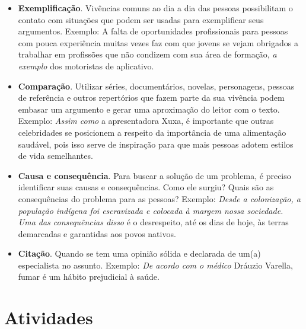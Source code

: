 {\begin{itemize}
\item \textbf{Exemplificação}. Vivências comuns ao dia a dia das pessoas possibilitam o contato com situações que podem ser usadas para exemplificar seus argumentos. Exemplo: A falta de oportunidades profissionais para pessoas com pouca experiência muitas vezes faz com que jovens se vejam obrigados a trabalhar em profissões que não condizem com sua área de formação, \emph{a exemplo} dos motoristas de aplicativo.

\item \textbf{Comparação}. Utilizar séries, documentários, novelas, personagens, pessoas de referência e outros repertórios que fazem parte da sua vivência podem embasar um argumento e gerar uma aproximação do leitor com o texto. Exemplo: \emph{Assim como} a apresentadora Xuxa, é importante que outras celebridades se posicionem a respeito da importância de uma alimentação saudável, pois isso serve de inspiração para que mais pessoas adotem estilos de vida semelhantes.

\item \textbf{Causa e consequência}. Para buscar a solução de um problema, é preciso identificar suas causas e consequências. Como ele surgiu? Quais são as consequências do problema para as pessoas? Exemplo: \emph{Desde a colonização, a população indígena foi escravizada e colocada à margem nossa sociedade. Uma das consequências disso} é o desrespeito, até os dias de hoje, às terras demarcadas e garantidas aos povos nativos.

\item \textbf{Citação}. Quando se tem uma opinião sólida e declarada de um(a) especialista no assunto. Exemplo: \emph{De acordo com o médico} Dráuzio Varella, fumar é um hábito prejudicial à saúde.
\end{itemize}}


\section*{Atividades}

\hspace\parindent{Leia o texto a seguir, publicado no Jornal da USP, e responda às
questões de 1 a 3.}



